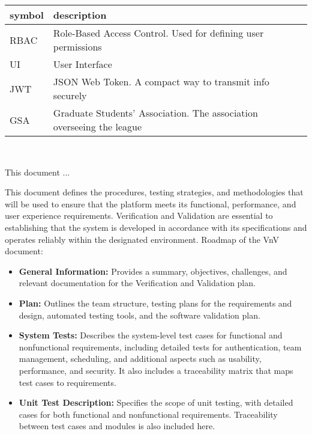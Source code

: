 \documentclass[12pt, titlepage]{article}
\begin{document}
\renewcommand{\arraystretch}{1.2}
\begin{tabular}{l l}
  \toprule
  \textbf{symbol} & \textbf{description}                                                  \\
  \midrule
  RBAC            & Role-Based Access Control. Used for defining user permissions         \\
  UI              & User Interface                                                        \\
  JWT             & JSON Web Token. A compact way to transmit info securely               \\
  GSA             & Graduate Students' Association. The association overseeing the league \\
  \bottomrule
\end{tabular}\\

\newpage


This document ... 

This document defines the procedures, testing strategies, and methodologies that will be used to ensure that the platform meets its functional, performance, and user experience requirements. Verification and Validation are essential to establishing that the system is developed in accordance with its specifications and operates reliably within the designated environment.
Roadmap of the VnV document:
\begin{itemize}
  \item \textbf{General Information:} Provides a summary, objectives, challenges, and relevant documentation for the Verification and Validation plan.
  \item \textbf{Plan:} Outlines the team structure, testing plans for the requirements and design, automated testing tools, and the software validation plan.
  \item \textbf{System Tests:} Describes the system-level test cases for functional and nonfunctional requirements, including detailed tests for authentication, team management, scheduling, and additional aspects such as usability, performance, and security. It also includes a traceability matrix that maps test cases to requirements.
  \item \textbf{Unit Test Description:} Specifies the scope of unit testing, with detailed cases for both functional and nonfunctional requirements. Traceability between test cases and modules is also included here.
\end{itemize}
\end{document}
